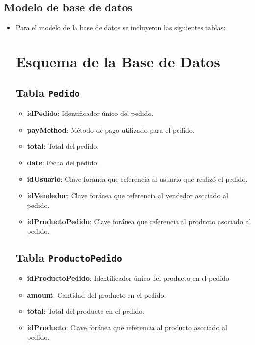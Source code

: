 \documentclass{article}
\begin{document}
  
	\subsection{Modelo de base de datos}
	\begin{itemize}	
            \item Para el modelo de la base de datos se incluyeron las siguientes tablas:
            
            \section*{Esquema de la Base de Datos}

\subsection*{Tabla \texttt{Pedido}}
\begin{itemize}[leftmargin=*]
    \item \textbf{idPedido}: Identificador único del pedido.
    \item \textbf{payMethod}: Método de pago utilizado para el pedido.
    \item \textbf{total}: Total del pedido.
    \item \textbf{date}: Fecha del pedido.
    \item \textbf{idUsuario}: Clave foránea que referencia al usuario que realizó el pedido.
    \item \textbf{idVendedor}: Clave foránea que referencia al vendedor asociado al pedido.
    \item \textbf{idProductoPedido}: Clave foránea que referencia al producto asociado al pedido.
\end{itemize}

\subsection*{Tabla \texttt{ProductoPedido}}
\begin{itemize}[leftmargin=*]
    \item \textbf{idProductoPedido}: Identificador único del producto en el pedido.
    \item \textbf{amount}: Cantidad del producto en el pedido.
    \item \textbf{total}: Total del producto en el pedido.
    \item \textbf{idProducto}: Clave foránea que referencia al producto asociado al pedido.
\end{itemize}


\end{itemize}
\end{document}
